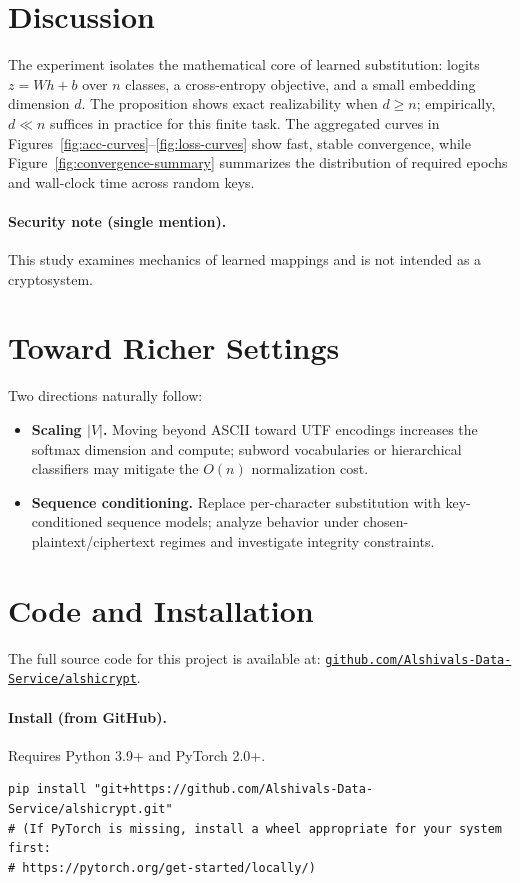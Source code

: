 \documentclass[12pt]{article}
\theoremstyle{plain}
\theoremstyle{remark}
\begin{document}
\section{Discussion}
The experiment isolates the mathematical core of learned substitution: logits $z=Wh+b$ over $n$ classes, a cross-entropy objective, and a small embedding dimension $d$. The proposition shows exact realizability when $d\ge n$; empirically, $d\ll n$ suffices in practice for this finite task. The aggregated curves in Figures~\ref{fig:acc-curves}--\ref{fig:loss-curves} show fast, stable convergence, while Figure~\ref{fig:convergence-summary} summarizes the distribution of required epochs and wall-clock time across random keys.

\paragraph{Security note (single mention).} This study examines mechanics of learned mappings and is not intended as a cryptosystem.

\section{Toward Richer Settings}
Two directions naturally follow:
\begin{itemize}
    \item \textbf{Scaling $|V|$.} Moving beyond ASCII toward UTF encodings increases the softmax dimension and compute; subword vocabularies or hierarchical classifiers may mitigate the $O(n)$ normalization cost.
    \item \textbf{Sequence conditioning.} Replace per-character substitution with key-conditioned sequence models; analyze behavior under chosen-plaintext/ciphertext regimes and investigate integrity constraints.
\end{itemize}

\section{Code and Installation}
The full source code for this project is available at:
\href{https://github.com/Alshivals-Data-Service/alshicrypt}{\texttt{github.com/Alshivals-Data-Service/alshicrypt}}.

\paragraph{Install (from GitHub).}
Requires Python 3.9+ and PyTorch 2.0+.
\begin{verbatim}
pip install "git+https://github.com/Alshivals-Data-Service/alshicrypt.git"
# (If PyTorch is missing, install a wheel appropriate for your system first:
# https://pytorch.org/get-started/locally/)
\end{verbatim}
\end{document}
